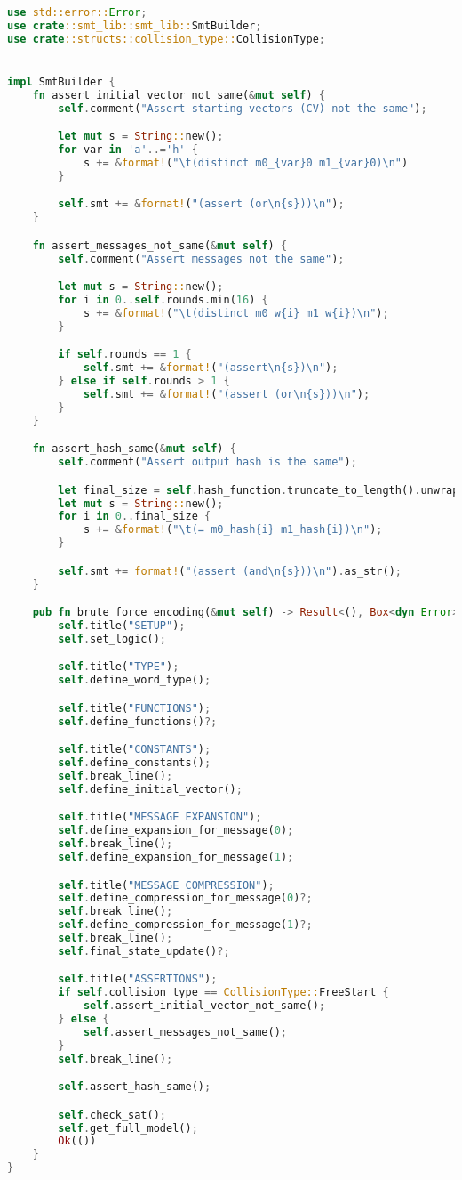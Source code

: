 \begin{lstlisting}[language=rust, caption={smt\_lib/encodings/brute\_force.rs}]
use std::error::Error;
use crate::smt_lib::smt_lib::SmtBuilder;
use crate::structs::collision_type::CollisionType;


impl SmtBuilder {
	fn assert_initial_vector_not_same(&mut self) {
		self.comment("Assert starting vectors (CV) not the same");

		let mut s = String::new();
		for var in 'a'..='h' {
			s += &format!("\t(distinct m0_{var}0 m1_{var}0)\n")
		}

		self.smt += &format!("(assert (or\n{s}))\n");
	}

	fn assert_messages_not_same(&mut self) {
		self.comment("Assert messages not the same");

		let mut s = String::new();
		for i in 0..self.rounds.min(16) {
			s += &format!("\t(distinct m0_w{i} m1_w{i})\n");
		}

		if self.rounds == 1 {
			self.smt += &format!("(assert\n{s})\n");
		} else if self.rounds > 1 {
			self.smt += &format!("(assert (or\n{s}))\n");
		}
	}

	fn assert_hash_same(&mut self) {
		self.comment("Assert output hash is the same");

		let final_size = self.hash_function.truncate_to_length().unwrap_or(8);
		let mut s = String::new();
		for i in 0..final_size {
			s += &format!("\t(= m0_hash{i} m1_hash{i})\n");
		}

		self.smt += format!("(assert (and\n{s}))\n").as_str();
	}

	pub fn brute_force_encoding(&mut self) -> Result<(), Box<dyn Error>>{
		self.title("SETUP");
		self.set_logic();

		self.title("TYPE");
		self.define_word_type();

		self.title("FUNCTIONS");
		self.define_functions()?;

		self.title("CONSTANTS");
		self.define_constants();
		self.break_line();
		self.define_initial_vector();

		self.title("MESSAGE EXPANSION");
		self.define_expansion_for_message(0);
		self.break_line();
		self.define_expansion_for_message(1);

		self.title("MESSAGE COMPRESSION");
		self.define_compression_for_message(0)?;
		self.break_line();
		self.define_compression_for_message(1)?;
		self.break_line();
		self.final_state_update()?;

		self.title("ASSERTIONS");
		if self.collision_type == CollisionType::FreeStart {
			self.assert_initial_vector_not_same();
		} else {
			self.assert_messages_not_same();
		}
		self.break_line();

		self.assert_hash_same();

		self.check_sat();
		self.get_full_model();
		Ok(())
	}
}
\end{lstlisting}

